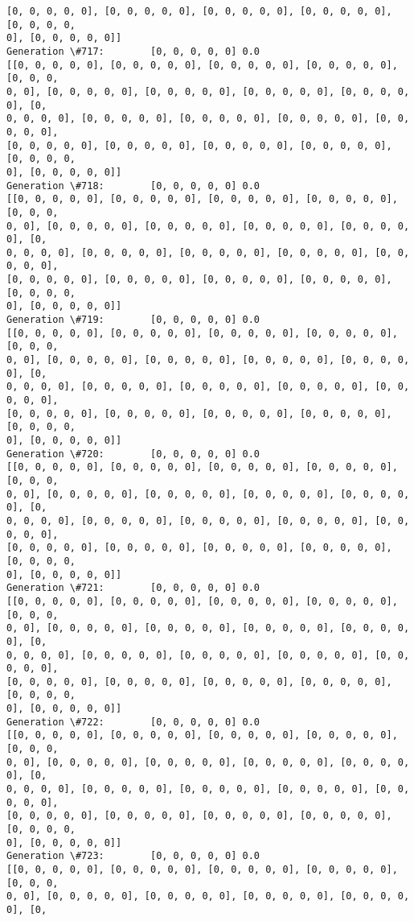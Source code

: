 \documentclass[11pt]{article}
\begin{document}
\begin{Verbatim}[commandchars=\\\{\}]
[0, 0, 0, 0, 0], [0, 0, 0, 0, 0], [0, 0, 0, 0, 0], [0, 0, 0, 0, 0], [0, 0, 0, 0,
0], [0, 0, 0, 0, 0]]
Generation \#717:        [0, 0, 0, 0, 0] 0.0
[[0, 0, 0, 0, 0], [0, 0, 0, 0, 0], [0, 0, 0, 0, 0], [0, 0, 0, 0, 0], [0, 0, 0,
0, 0], [0, 0, 0, 0, 0], [0, 0, 0, 0, 0], [0, 0, 0, 0, 0], [0, 0, 0, 0, 0], [0,
0, 0, 0, 0], [0, 0, 0, 0, 0], [0, 0, 0, 0, 0], [0, 0, 0, 0, 0], [0, 0, 0, 0, 0],
[0, 0, 0, 0, 0], [0, 0, 0, 0, 0], [0, 0, 0, 0, 0], [0, 0, 0, 0, 0], [0, 0, 0, 0,
0], [0, 0, 0, 0, 0]]
Generation \#718:        [0, 0, 0, 0, 0] 0.0
[[0, 0, 0, 0, 0], [0, 0, 0, 0, 0], [0, 0, 0, 0, 0], [0, 0, 0, 0, 0], [0, 0, 0,
0, 0], [0, 0, 0, 0, 0], [0, 0, 0, 0, 0], [0, 0, 0, 0, 0], [0, 0, 0, 0, 0], [0,
0, 0, 0, 0], [0, 0, 0, 0, 0], [0, 0, 0, 0, 0], [0, 0, 0, 0, 0], [0, 0, 0, 0, 0],
[0, 0, 0, 0, 0], [0, 0, 0, 0, 0], [0, 0, 0, 0, 0], [0, 0, 0, 0, 0], [0, 0, 0, 0,
0], [0, 0, 0, 0, 0]]
Generation \#719:        [0, 0, 0, 0, 0] 0.0
[[0, 0, 0, 0, 0], [0, 0, 0, 0, 0], [0, 0, 0, 0, 0], [0, 0, 0, 0, 0], [0, 0, 0,
0, 0], [0, 0, 0, 0, 0], [0, 0, 0, 0, 0], [0, 0, 0, 0, 0], [0, 0, 0, 0, 0], [0,
0, 0, 0, 0], [0, 0, 0, 0, 0], [0, 0, 0, 0, 0], [0, 0, 0, 0, 0], [0, 0, 0, 0, 0],
[0, 0, 0, 0, 0], [0, 0, 0, 0, 0], [0, 0, 0, 0, 0], [0, 0, 0, 0, 0], [0, 0, 0, 0,
0], [0, 0, 0, 0, 0]]
Generation \#720:        [0, 0, 0, 0, 0] 0.0
[[0, 0, 0, 0, 0], [0, 0, 0, 0, 0], [0, 0, 0, 0, 0], [0, 0, 0, 0, 0], [0, 0, 0,
0, 0], [0, 0, 0, 0, 0], [0, 0, 0, 0, 0], [0, 0, 0, 0, 0], [0, 0, 0, 0, 0], [0,
0, 0, 0, 0], [0, 0, 0, 0, 0], [0, 0, 0, 0, 0], [0, 0, 0, 0, 0], [0, 0, 0, 0, 0],
[0, 0, 0, 0, 0], [0, 0, 0, 0, 0], [0, 0, 0, 0, 0], [0, 0, 0, 0, 0], [0, 0, 0, 0,
0], [0, 0, 0, 0, 0]]
Generation \#721:        [0, 0, 0, 0, 0] 0.0
[[0, 0, 0, 0, 0], [0, 0, 0, 0, 0], [0, 0, 0, 0, 0], [0, 0, 0, 0, 0], [0, 0, 0,
0, 0], [0, 0, 0, 0, 0], [0, 0, 0, 0, 0], [0, 0, 0, 0, 0], [0, 0, 0, 0, 0], [0,
0, 0, 0, 0], [0, 0, 0, 0, 0], [0, 0, 0, 0, 0], [0, 0, 0, 0, 0], [0, 0, 0, 0, 0],
[0, 0, 0, 0, 0], [0, 0, 0, 0, 0], [0, 0, 0, 0, 0], [0, 0, 0, 0, 0], [0, 0, 0, 0,
0], [0, 0, 0, 0, 0]]
Generation \#722:        [0, 0, 0, 0, 0] 0.0
[[0, 0, 0, 0, 0], [0, 0, 0, 0, 0], [0, 0, 0, 0, 0], [0, 0, 0, 0, 0], [0, 0, 0,
0, 0], [0, 0, 0, 0, 0], [0, 0, 0, 0, 0], [0, 0, 0, 0, 0], [0, 0, 0, 0, 0], [0,
0, 0, 0, 0], [0, 0, 0, 0, 0], [0, 0, 0, 0, 0], [0, 0, 0, 0, 0], [0, 0, 0, 0, 0],
[0, 0, 0, 0, 0], [0, 0, 0, 0, 0], [0, 0, 0, 0, 0], [0, 0, 0, 0, 0], [0, 0, 0, 0,
0], [0, 0, 0, 0, 0]]
Generation \#723:        [0, 0, 0, 0, 0] 0.0
[[0, 0, 0, 0, 0], [0, 0, 0, 0, 0], [0, 0, 0, 0, 0], [0, 0, 0, 0, 0], [0, 0, 0,
0, 0], [0, 0, 0, 0, 0], [0, 0, 0, 0, 0], [0, 0, 0, 0, 0], [0, 0, 0, 0, 0], [0,

\end{Verbatim}
\end{document}
